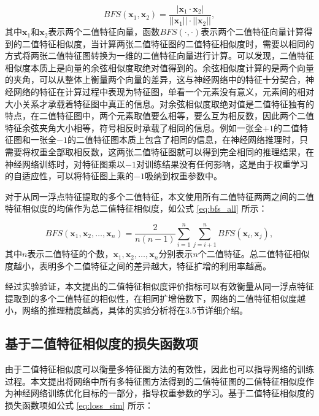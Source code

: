 \begin{equation}
  \label{eq:bfs}
  BFS(\bm{x}_1, \bm{x}_2) = \frac{|\bm{x}_1 \cdot \bm{x}_2|}{||\bm{x}_1||\cdot||\bm{x}_2||},
\end{equation}
其中$\bm{x}_1$和$\bm{x}_2$表示两个二值特征向量，函数$BFS(\cdot, \cdot)$表示两个二值特征向量计算得到的二值特征相似度，当计算两张二值特征图的二值特征相似度时，需要以相同的方式将两张二值特征图转换为一维的二值特征向量进行计算。可以发现，二值特征相似度本质上是向量的余弦相似度取绝对值得到的。余弦相似度计算的是两个向量的夹角，可以从整体上衡量两个向量的差异，这与神经网络中的特征十分契合，神经网络的特征在计算过程中表现为特征图，单看一个元素没有意义，元素间的相对大小关系才承载着特征图中真正的信息。对余弦相似度取绝对值是二值特征独有的特点，在二值特征图中，两个元素取值要么相等，要么互为相反数，因此两个二值特征余弦夹角大小相等，符号相反时承载了相同的信息。例如一张全$+1$的二值特征图和一张全$-1$的二值特征图本质上包含了相同的信息，在神经网络推理时，只需要将权重全部取相反数，这两张二值特征图就可以得到完全相同的推理结果，在神经网络训练时，对特征图乘以$-1$对训练结果没有任何影响，这是由于权重学习的自适应性，可以将特征图上乘的$-1$吸纳到权重参数中。

对于从同一浮点特征提取的多个二值特征，本文使用所有二值特征两两之间的二值特征相似度的均值作为总二值特征相似度，如公式 \eqref{eq:bfs_all} 所示：

\begin{equation}
  \label{eq:bfs_all}
  BFS(\bm{x}_1, \bm{x}_2, \dots, \bm{x}_n) = \frac{2}{n(n-1)} \sum_{i = 1}^{n} \sum_{j = i+1}^{n} BFS(\bm{x}_i, \bm{x}_j),
\end{equation}
其中$n$表示二值特征的个数，$\bm{x}_1, \bm{x}_2, \dots, \bm{x}_n$分别表示$n$个二值特征。总二值特征相似度越小，表明多个二值特征之间的差异越大，特征扩增的利用率越高。

经过实验验证，本文提出的二值特征相似度评价指标可以有效衡量从同一浮点特征提取到的多个二值特征的相似性，在相同扩增倍数下，网络的二值特征相似度越小，网络的推理精度越高，具体的实验分析将在3.5节详细介绍。

\subsection{基于二值特征相似度的损失函数项}

由于二值特征相似度可以衡量多特征图方法的有效性，因此也可以指导网络的训练过程。本文提出将网络中所有多特征图方法得到的二值特征图的二值特征相似度作为神经网络训练优化目标的一部分，指导权重参数的学习。基于二值特征相似度的损失函数项如公式 \eqref{eq:loss_sim} 所示：

